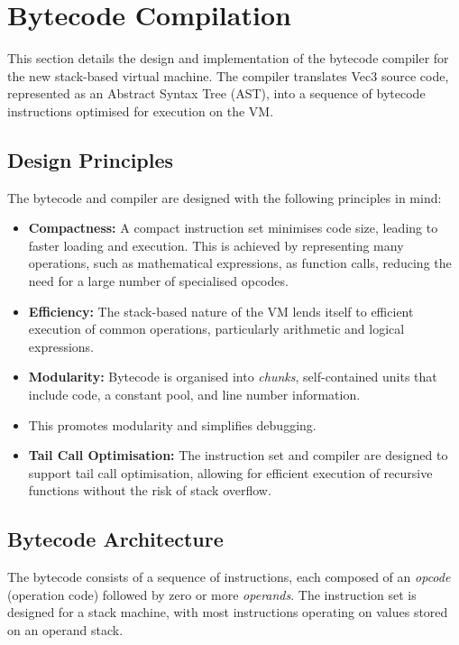 \section{Bytecode Compilation}
\label{sec:bytecode-compilation}

This section details the design and implementation of the bytecode compiler for the new stack-based virtual machine.
The compiler translates Vec3 source code, represented as an Abstract Syntax Tree (AST), into a sequence of bytecode 
instructions optimised for execution on the VM\@.

\subsection{Design Principles}\label{subsec:design-principles}

The bytecode and compiler are designed with the following principles in mind:

\begin{itemize}
    \item \textbf{Compactness:} A compact instruction set minimises code size, leading to faster loading and execution.
    This is achieved by representing many operations, such as mathematical expressions, as function calls, reducing 
    the need for a large number of specialised opcodes.
    \item \textbf{Efficiency:} The stack-based nature of the VM lends itself to efficient execution of common operations, particularly arithmetic and logical expressions.
    \item \textbf{Modularity:} Bytecode is organised into \textit{chunks}, self-contained units that include code, a 
    constant pool, and line number information. 
    \item This promotes modularity and simplifies debugging.
    \item \textbf{Tail Call Optimisation:} The instruction set and compiler are designed to support tail call 
    optimisation, allowing for efficient execution of recursive functions without the risk of stack overflow.
\end{itemize}

\subsection{Bytecode Architecture}\label{subsec:bytecode-architecture}

The bytecode consists of a sequence of instructions, each composed of an \textit{opcode} (operation code) followed by zero or more \textit{operands}.
The instruction set is designed for a stack machine, with most instructions operating on values stored on an operand stack.

